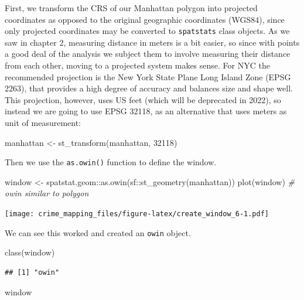\documentclass[
  krantz2]{krantz}
\makeatletter
\newenvironment{Shaded}{\begin{snugshade}}{\end{snugshade}}
\newcommand{\CommentTok}[1]{\textcolor[rgb]{0.37,0.37,0.37}{\textit{#1}}}
\newcommand{\DecValTok}[1]{\textcolor[rgb]{0.06,0.06,0.06}{#1}}
\newcommand{\FunctionTok}[1]{\textcolor[rgb]{0,0,0}{#1}}
\newcommand{\NormalTok}[1]{#1}
\newcommand{\OtherTok}[1]{\textcolor[rgb]{0.37,0.37,0.37}{#1}}
\newcommand{\SpecialCharTok}[1]{\textcolor[rgb]{0,0,0}{#1}}
\newenvironment{kframe}{%
\medskip{}
\setlength{\fboxsep}{.8em}
 \def\at@end@of@kframe{}%
 \ifinner\ifhmode%
  \def\at@end@of@kframe{\end{minipage}}%
  \begin{minipage}{\columnwidth}%
 \fi\fi%
 \def\FrameCommand##1{\hskip\@totalleftmargin \hskip-\fboxsep
 \colorbox{shadecolor}{##1}\hskip-\fboxsep
     \hskip-\linewidth \hskip-\@totalleftmargin \hskip\columnwidth}%
 \MakeFramed {\advance\hsize-\width
   \@totalleftmargin\z@ \linewidth\hsize
   \@setminipage}}%
 {\par\unskip\endMakeFramed%
 \at@end@of@kframe}
\renewenvironment{Shaded}{\begin{kframe}}{\end{kframe}}
\makeatother
\begin{document}
First, we transform the CRS of our Manhattan polygon into projected coordinates as opposed to the original geographic coordinates (WGS84), since only projected coordinates may be converted to \texttt{spatstats} class objects. As we saw in chapter 2, measuring distance in meters is a bit easier, so since with points a good deal of the analysis we subject them to involve measuring their distance from each other, moving to a projected system makes sense. For NYC the recommended projection is the New York State Plane Long Island Zone (EPSG 2263), that provides a high degree of accuracy and balances size and shape well. This projection, however, uses US feet (which will be deprecated in 2022), so instead we are going to use EPSG 32118, as an alternative that uses meters as unit of measurement:

\begin{Shaded}
\begin{Highlighting}[]
\NormalTok{manhattan }\OtherTok{\textless{}{-}} \FunctionTok{st\_transform}\NormalTok{(manhattan, }\DecValTok{32118}\NormalTok{)}
\end{Highlighting}
\end{Shaded}

Then we use the \texttt{as.owin()} function to define the window.

\begin{Shaded}
\begin{Highlighting}[]
\NormalTok{window }\OtherTok{\textless{}{-}}\NormalTok{ spatstat.geom}\SpecialCharTok{::}\FunctionTok{as.owin}\NormalTok{(sf}\SpecialCharTok{::}\FunctionTok{st\_geometry}\NormalTok{(manhattan))}
\FunctionTok{plot}\NormalTok{(window) }\CommentTok{\# owin similar to polygon}
\end{Highlighting}
\end{Shaded}

\texttt{[image: crime\_mapping\_files/figure-latex/create\_window\_6-1.pdf]}

We can see this worked and created an \texttt{owin} object.

\begin{Shaded}
\begin{Highlighting}[]
\FunctionTok{class}\NormalTok{(window)}
\end{Highlighting}
\end{Shaded}

\begin{verbatim}
## [1] "owin"
\end{verbatim}

\begin{Shaded}
\begin{Highlighting}[]
\NormalTok{window}
\end{Highlighting}
\end{Shaded}
\end{document}
